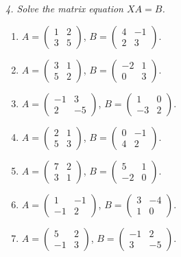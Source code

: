 \emph{4. Solve the matrix equation $XA=B$.}
\bigskip
\begin{enumerate}[label=\arabic*.,  leftmargin=*]
\item $A=\begin{pmatrix}1&2\\3&5\end{pmatrix}$, $B=\begin{pmatrix}4&-1\\2&3\end{pmatrix}$.
\item $A=\begin{pmatrix}3&1\\5&2\end{pmatrix}$, $B=\begin{pmatrix}-2&1\\0&3\end{pmatrix}$.
\item $A=\begin{pmatrix}-1&3\\2&-5\end{pmatrix}$, $B=\begin{pmatrix}1&0\\-3&2\end{pmatrix}$.
\item $A=\begin{pmatrix}2&1\\5&3\end{pmatrix}$, $B=\begin{pmatrix}0&-1\\4&2\end{pmatrix}$.
\item $A=\begin{pmatrix}7&2\\3&1\end{pmatrix}$, $B=\begin{pmatrix}5&1\\-2&0\end{pmatrix}$.
\item $A=\begin{pmatrix}1&-1\\-1&2\end{pmatrix}$, $B=\begin{pmatrix}3&-4\\1&0\end{pmatrix}$.
\item $A=\begin{pmatrix}5&2\\-1&3\end{pmatrix}$, $B=\begin{pmatrix}-1&2\\3&-5\end{pmatrix}$.

\end{enumerate}
